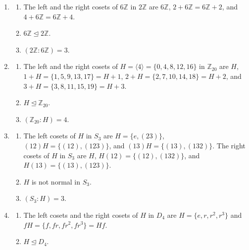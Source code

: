 \documentclass[10pt,]{book}
\theoremstyle{plain}
\theoremstyle{definition}
\theoremstyle{definition}
\theoremstyle{definition}
\theoremstyle{definition}
\numberwithin{equation}{section}
\def\Z{\mathbb{Z}}
\begin{document}
\begin{enumerate}[label=(\alph*)]
\item\hypertarget{li-425}{}%
\begin{enumerate}[label=\roman*.]
\item\hypertarget{li-426}{}
            The left and the right cosets of \(6\Z\) in \(2\Z\) are \(6\Z\), \(2+6\Z=6\Z+2\), and \(4+6\Z=6\Z+4\).
\item\hypertarget{li-427}{}
            \(6\Z \unlhd 2\Z\).
\item\hypertarget{li-428}{}
            \((2\Z:6\Z)=3\).
\end{enumerate}
%
\item\hypertarget{li-429}{}%
\begin{enumerate}[label=\roman*.]
\item\hypertarget{li-430}{}
            The left and the right cosets of \(H=\langle 4\rangle =\{0,4,8,12,16\}\) in \(\Z_{20}\) are \(H\), \(1+H=\{1,5,9,13,17\}=H+1\), \(2+H=\{2,7,10,14,18\}=H+2\), and \(3+H=\{3,8,11,15,19\}=H+3\).
\item\hypertarget{li-431}{}
            \(H \unlhd \Z_{20}\).
\item\hypertarget{li-432}{}
            \((\Z_{20}:H)=4\).
\end{enumerate}
%
\item\hypertarget{li-433}{}%
\begin{enumerate}[label=\roman*.]
\item\hypertarget{li-434}{}
            The left cosets of \(H\) in \(S_3\) are \(H=\{e,(23)\}\), \((12)H=\{(12),(123)\}\), and \((13)H=\{(13),(132)\}\). The right cosets of \(H\) in \(S_3\) are \(H\), \(H(12)=\{(12),(132)\}\), and \(H(13)=\{(13),(123)\}\).
\item\hypertarget{li-435}{}
            \(H\) is not normal in \(S_3\).
\item\hypertarget{li-436}{}
            \((S_3:H)=3\).
\end{enumerate}
%
\item\hypertarget{li-437}{}%
\begin{enumerate}[label=\roman*.]
\item\hypertarget{li-438}{}
            The left cosets and the right cosets of \(H\) in \(D_4\) are \(H=\{e,r,r^2,r^3\}\) and \(fH=\{f,fr, fr^2, fr^3\}=Hf\).
\item\hypertarget{li-439}{}
            \(H\unlhd D_4\).

\end{enumerate}
\end{enumerate}
\end{document}
